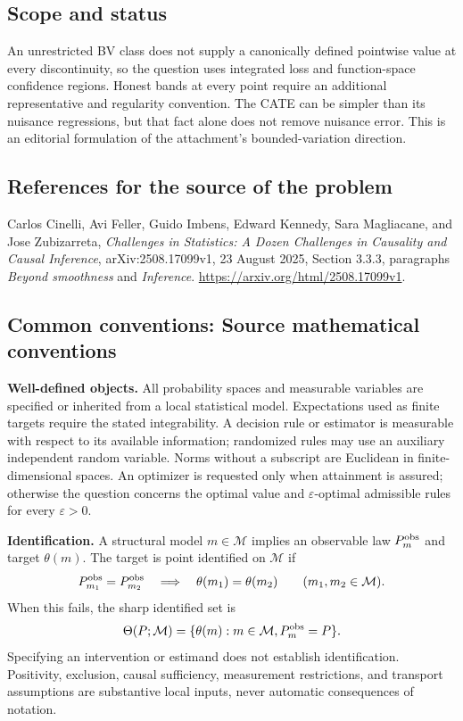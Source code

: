 \documentclass[11pt,a4paper]{article}
\begin{document}
\subsection*{Scope and status}
An unrestricted BV class does not supply a canonically defined pointwise value at every discontinuity, so the question uses integrated loss and function-space confidence regions. Honest bands at every point require an additional representative and regularity convention. The CATE can be simpler than its nuisance regressions, but that fact alone does not remove nuisance error. This is an editorial formulation of the attachment's bounded-variation direction.
\subsection*{References for the source of the problem}
Carlos Cinelli, Avi Feller, Guido Imbens, Edward Kennedy, Sara Magliacane, and Jose Zubizarreta, \emph{Challenges in Statistics: A Dozen Challenges in Causality and Causal Inference}, arXiv:2508.17099v1, 23 August 2025, Section 3.3.3, paragraphs \emph{Beyond smoothness} and \emph{Inference}. \url{https://arxiv.org/html/2508.17099v1}.

\subsection*{Common conventions: Source mathematical conventions}

\textbf{Well-defined objects.}
All probability spaces and measurable variables are specified or inherited
from a local statistical model. Expectations used as finite targets require
the stated integrability. A decision rule or estimator is measurable with
respect to its available information; randomized rules may use an auxiliary
independent random variable. Norms without a subscript are Euclidean in
finite-dimensional spaces. An optimizer is requested only when attainment
is assured; otherwise the question concerns the optimal value and
$\varepsilon$-optimal admissible rules for every $\varepsilon>0$.

\textbf{Identification.}
A structural model $m\in\mathcal M$ implies an observable law
$P_m^{\rm obs}$ and target $\theta(m)$. The target is point identified on
$\mathcal M$ if
\[
 P_{m_1}^{\rm obs}=P_{m_2}^{\rm obs}
 \quad\Longrightarrow\quad\theta(m_1)=\theta(m_2)
 \qquad(m_1,m_2\in\mathcal M).
\]
When this fails, the sharp identified set is
\[
 \Theta(P;\mathcal M)=\{\theta(m):m\in\mathcal M,
                                  P_m^{\rm obs}=P\}.
\]
Specifying an intervention or estimand does not establish identification.
Positivity, exclusion, causal sufficiency, measurement restrictions, and
transport assumptions are substantive local inputs, never automatic
consequences of notation.
\end{document}
